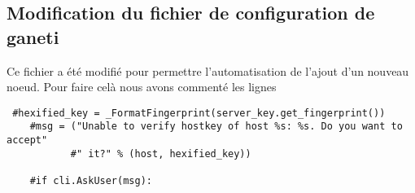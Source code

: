 \subsection{Modification du fichier de configuration de ganeti}

Ce fichier a été modifié pour permettre l'automatisation de l'ajout d'un nouveau noeud. Pour faire celà nous avons commenté les lignes 
\begin{lstlisting}
 #hexified_key = _FormatFingerprint(server_key.get_fingerprint())
    #msg = ("Unable to verify hostkey of host %s: %s. Do you want to accept"
           #" it?" % (host, hexified_key))

    #if cli.AskUser(msg):
\end{lstlisting}
